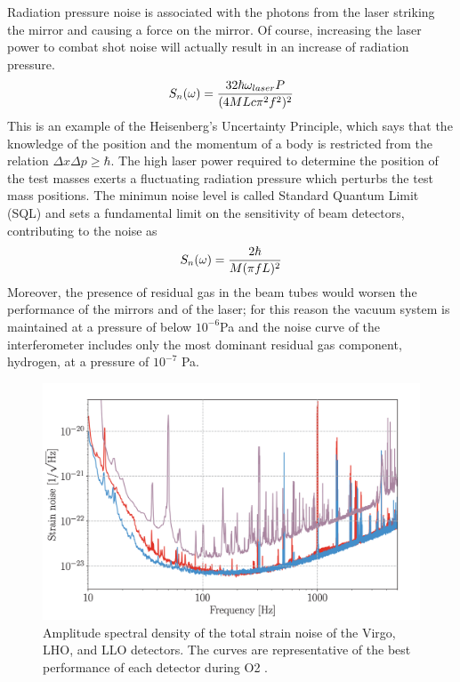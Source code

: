 \documentclass[binding=0.6cm, LaM]{sapthesis}
\begin{document}
        Radiation pressure noise is associated with the photons from the laser striking the mirror
        and causing a force on the mirror. Of course, increasing the laser power to combat shot noise
        will actually result in an increase of radiation pressure.
                \begin{equation}
                	S_n(\omega) =  {{32 \hbar \omega_{laser}P} \over {(4MLc \pi^2 f^2)^2}}
                \end{equation}
        This is an example of the Heisenberg’s Uncertainty Principle, which says that the knowledge
        of the position and the momentum of a body is restricted from the relation $\Delta x \Delta p \geq \hbar$. 
        The high laser power required to determine the position of the test masses exerts
        a fluctuating radiation pressure which perturbs the test mass positions. 
        The minimun noise level is called Standard Quantum Limit (SQL) and sets a fundamental limit
        on the sensitivity of beam detectors, contributing to the noise as
                \begin{equation}
                	S_n(\omega) = {{2 \hbar} \over {M(\pi f L)^2}}
                \end{equation}
        Moreover, the presence of residual gas in the beam tubes would worsen the performance
        of the mirrors and of the laser; for this reason the vacuum system is maintained at a pressure
        of below $10^{-6}$Pa and the noise curve of the interferometer includes only
        the most dominant residual gas component, hydrogen, at a pressure of $10^{−7}$ Pa. 
		\begin{figure}[H]
                	\includegraphics[scale=0.6]{noise1}
                	\centering
                	\caption{Amplitude spectral density of the total strain noise  of the Virgo, LHO, and LLO detectors. The curves are representative of the best performance of each detector during O2 \cite{13}.}
                	\label{fig:noise1}
                \end{figure}
\end{document}
